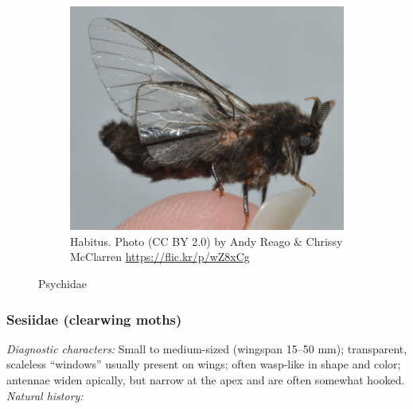 \documentclass[letterpaper, 11pt]{article}
\begin{document}
\begin{figure}[ht!]
\begin{subfigure}[ht!]{0.35\textwidth}
        \includegraphics[width=\textwidth]{psychid1}
        \caption{Habitus. Photo (CC BY 2.0) by Andy Reago \& Chrissy McClarren \url{https://flic.kr/p/wZ8xCg}}
        \label{fig:psychid3}
    \end{subfigure}
    \caption{Psychidae}\label{fig:psychids}
\end{figure}

\subsubsection{Sesiidae (clearwing moths)}
\noindent{}\textit{Diagnostic characters:} Small to medium-sized (wingspan 15--50 mm); transparent, scaleless ``windows'' usually present on wings; often wasp-like in shape and color; antennae widen apically, but narrow at the apex and are often somewhat hooked.\\

\noindent{}\textit{Natural history:} 
\end{document}
